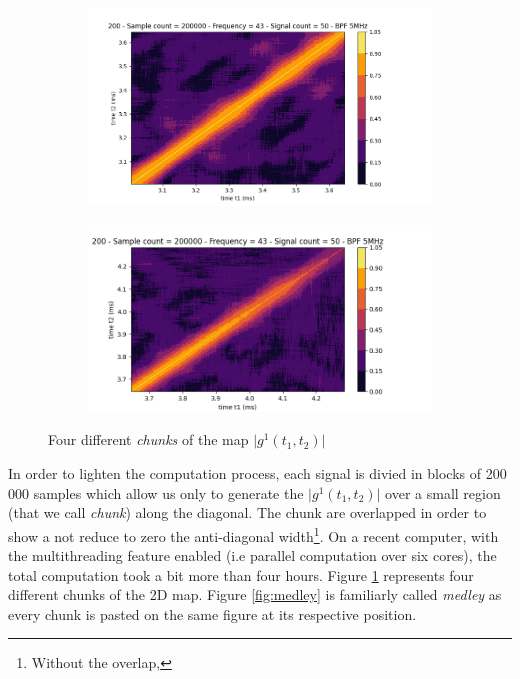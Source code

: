 \documentclass[10pt]{report}
\begin{document}
\begin{figure}[h!]
\centering
\begin{subfigure}{.48\textwidth}
  \centering
  \includegraphics[width=1.1\linewidth]{sp-g12-4}
\end{subfigure}%
\hspace{1em}%
\begin{subfigure}{.48\textwidth}
  \centering
  \includegraphics[width=1.1\linewidth]{sp-g12-2}
\end{subfigure}
\caption{Four different \textit{chunks} of the map $\vert g^1(t_1, t_2) \vert$}
\label{fig:sp-g12}
\end{figure}

In order to lighten the computation process, each signal is divied in blocks of 200 000 samples which allow us only to generate the $\vert g^1(t_1, t_2) \vert$ over a small region (that we call \textit{chunk}) along the diagonal. The chunk are overlapped in order to show a not reduce to zero the anti-diagonal width\footnote{Without the overlap, }. On a recent computer, with the multithreading feature enabled (i.e parallel computation over six cores), the total computation took a bit more than four hours. Figure \ref{fig:sp-g12} represents four different chunks of the 2D map. Figure \ref{fig:medley} is familiarly called \textit{medley} as every chunk is pasted on the same figure at its respective position.
\end{document}
